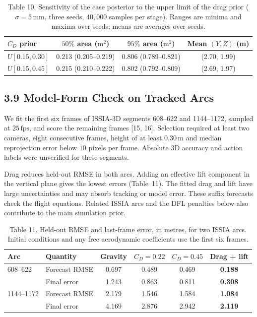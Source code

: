 \begin{table}[htbp]
  
  \caption{Table 10. Sensitivity of the case posterior to the upper limit of the drag prior ($\sigma=5\,\mathrm{mm}$, three seeds, $40{,}000$ samples per stage). Ranges are minima and maxima over seeds; means are averages over seeds.}
  \begin{tabular}{lccc}
    \toprule
    $C_D$ prior & $50\%$ area ($\mathrm{m^2}$) & $95\%$ area ($\mathrm{m^2}$) & Mean $(Y,Z)$ (m) \\
    \midrule
    $U[0.15,0.30]$ & 0.213 (0.205--0.219) & 0.806 (0.789--0.821) & (2.70, 1.99) \\
    $U[0.15,0.45]$ & 0.215 (0.210--0.222) & 0.802 (0.792--0.809) & (2.69, 1.97) \\
    \bottomrule
  \end{tabular}
\end{table}

\subsection{3.9 Model-Form Check on Tracked Arcs}

We fit the first six frames of ISSIA-3D segments 608--622 and 1144--1172, sampled at $25\,\mathrm{fps}$, and score the remaining frames [15, 16]. Selection required at least two cameras, eight consecutive frames, height of at least $0.30\,\mathrm{m}$ and median reprojection error below $10$ pixels per frame. Absolute 3D accuracy and action labels were unverified for these segments.

Drag reduces held-out RMSE in both arcs. Adding an effective lift component in the vertical plane gives the lowest errors (Table~11). The fitted drag and lift have large uncertainties and may absorb tracking or model error. These suffix forecasts check the flight equations. Related ISSIA arcs and the DFL penalties below also contribute to the main simulation prior.

\begin{table}[htbp]
  
  \caption{Table 11. Held-out RMSE and last-frame error, in metres, for two ISSIA arcs. Initial conditions and any free aerodynamic coefficients use the first six frames.}
  \begin{tabular}{llcccc}
    \toprule
    Arc & Quantity & Gravity & $C_D=0.22$ & $C_D=0.45$ & Drag + lift \\
    \midrule
    608--622 & Forecast RMSE & 0.697 & 0.489 & 0.469 & \textbf{0.188} \\
             & Final error   & 1.243 & 0.863 & 0.811 & \textbf{0.308} \\
    1144--1172 & Forecast RMSE & 2.179 & 1.546 & 1.584 & \textbf{1.084} \\
               & Final error   & 4.169 & 2.876 & 2.942 & \textbf{2.119} \\
    \bottomrule
  \end{tabular}
\end{table}


